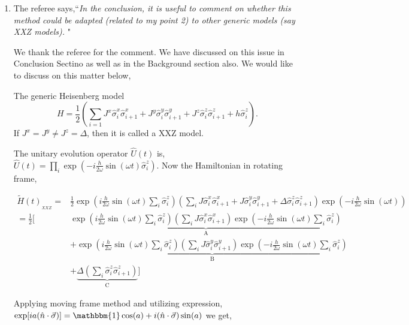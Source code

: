 \documentclass[aps,prb,reprint,showpacs,floatfix,superscriptaddress, onecolumn, nofootinbib, 9pt]{revtex4-2}
\newcommand{\response}[1]{{\color{blue}#1}} %
\begin{document}
\begin{enumerate}
		
		\vskip 2cm
		\item The referee says,``\textit{In the conclusion, it is useful to comment on whether this method could be adapted (related to my point 2) to other generic models (say
			XXZ models). }"\\
		
		\response{
		We thank the referee for the comment. We have discussed on this issue in Conclusion Sectino as well as in the Background section also.
		We would like to discuss on this matter below, 

		The generic Heisenberg model
		\begin{equation*}
			H = \frac12 \left( \sum_{i=1} J^x \hat{\sigma}^x_i \hat{\sigma}^x_{i+1} +J^y  \hat{\sigma}^y_i \hat{\sigma}^y_{i+1} + J^z  \hat{\sigma}^z_i \hat{\sigma}^z_{i+1} + h  \hat{\sigma}^z_i\right).
		\end{equation*}
		If $J^x= J^y \neq J^z=\Delta$, then it is called a XXZ model.
		
		The unitary evolution operator $\displaystyle \hat{U}(t)$ is, $\hat{U}(t)=\prod_{i} \exp \left(-i \frac{h}{2 \omega} \sin (\omega t) \hat{\sigma}_{i}^{z}\right)$. Now the Hamiltonian in rotating frame,
		
		\begin{align}
			\tilde{H}(t)_{_{XXZ}}= & \frac{1}{2} \exp \left(i \frac{h}{2 \omega} \sin (\omega t) \sum_{i} \hat{\sigma}_{i}^{z}\right)\left(\sum_{i} J \hat{\sigma}^x_i \hat{\sigma}^x_{i+1} + J \hat{\sigma}^y_i \hat{\sigma}^y_{i+1}+ \Delta  \hat{\sigma}^z_i \hat{\sigma}^z_{i+1}\right) \exp \left(-i \frac{h}{2 \omega} \sin (\omega t)\right)\nonumber\\
			= \frac12 \Bigg[& \underbrace{\exp \left(i \frac{h}{2 \omega} \sin (\omega t) \sum_{i} \hat{\sigma}_{i}^{z}\right)\left(\sum_{i} J \hat{\sigma}_{i}^{x} \hat{\sigma}_{i+1}^{x}\right) \exp \left(-i \frac{h}{2 \omega} \sin (\omega t) \sum_i\hat{\sigma}_{i}^{z}\right)}_{\mathrm{A}} \nonumber\\
			& +\underbrace{\exp \left(i \frac{h}{2 \omega} \sin (\omega t) \sum_{i} \hat{\sigma}_{i}^{z}\right)\left(\sum_{i} J \hat{\sigma}_{i}^{y} \hat{\sigma}_{i+1}^{y}\right) \exp \left(-i \frac{h}{2 \omega} \sin (\omega t) \sum_i\hat{\sigma}_{i}^{z}\right)}_{\mathrm{B}} \nonumber\\
			& +\underbrace{\Delta \left(\sum_{i}  \hat{\sigma}_{i}^{z} \hat{\sigma}_{i+1}^{z}\right)}_{\mathrm{C}}\Bigg]
			\label{eq:xxz1}
		\end{align}
	
		Applying moving frame method and utilizing  expression, $\displaystyle \exp[ia(\hat{n}\cdot\vec{\sigma})] = \mathbbm{1} \cos(a) + i (\hat{n}\cdot\vec{\sigma})\sin(a)$ we get,

}
\end{enumerate}
\end{document}
